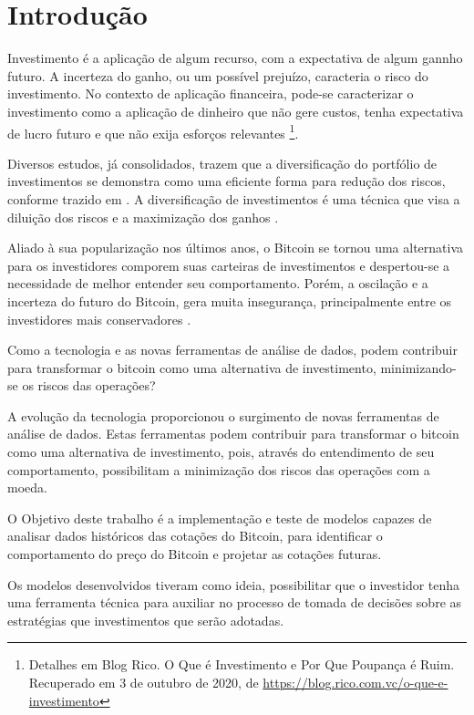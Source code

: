 \documentclass[12pt]{article}
\begin{document}
\section{Introdução}

Investimento é a aplicação de algum recurso, com a expectativa de algum gannho 
futuro. A incerteza do ganho, ou um possível prejuízo, caracteria o risco do
investimento. No contexto de aplicação financeira, pode-se caracterizar o 
investimento como a aplicação de dinheiro que não gere custos, tenha expectativa
de lucro futuro e que não exija esforços relevantes \footnote{Detalhes em Blog 
Rico. O Que é Investimento e Por Que Poupança é Ruim. Recuperado em 3 de
outubro de 2020, de \url{https://blog.rico.com.vc/o-que-e-investimento}}.

Diversos estudos, já consolidados, trazem que a diversificação do portfólio
de investimentos se demonstra como uma eficiente forma para redução dos riscos, 
conforme trazido em \cite{oda1998estudo}. A diversificação de investimentos é 
uma técnica que visa a diluição dos riscos e a maximização dos ganhos
\cite{btg:2017}.

Aliado à sua popularização nos últimos anos, o Bitcoin se tornou uma alternativa 
para os investidores comporem suas carteiras de investimentos e despertou-se a
necessidade de melhor entender seu comportamento. Porém, a oscilação e a 
incerteza do futuro do Bitcoin, gera muita insegurança, principalmente entre os 
investidores mais conservadores \cite{uol:2020}.

Como a tecnologia e as novas ferramentas de análise de dados, podem contribuir 
para transformar o bitcoin como uma alternativa de investimento, minimizando-se
os riscos das operações?

A evolução da tecnologia proporcionou o surgimento de novas ferramentas de 
análise de dados. Estas ferramentas podem contribuir para transformar o bitcoin 
como uma alternativa de investimento, pois, através do entendimento de seu 
comportamento, possibilitam a minimização dos riscos das operações com a moeda.

O Objetivo deste trabalho é a implementação e teste de modelos capazes de analisar
dados históricos das cotações do Bitcoin, para identificar o comportamento do 
preço do Bitcoin e projetar as cotações futuras.

Os modelos desenvolvidos tiveram como ideia, possibilitar que o investidor tenha 
uma ferramenta técnica para auxiliar no processo de tomada de decisões sobre as 
estratégias que investimentos que serão adotadas.
\end{document}
